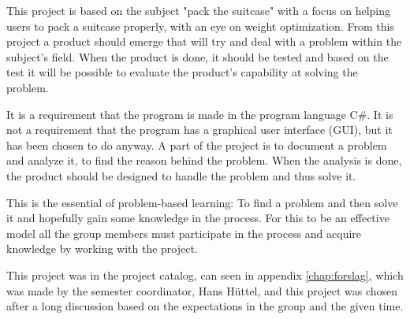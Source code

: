 This project is based on the subject "pack the suitcase" with a focus on helping users to pack a suitcase properly, with an eye on weight optimization. From this project a product should emerge that will try and deal with a problem within the subject's field. When the product is done, it should be tested and based on the test it will be possible to evaluate the product's capability at solving the problem.

It is a requirement that the program is made in the program language C\#. It is not a requirement that the program has a graphical user interface (GUI), but it has been chosen to do anyway.
A part of the project is to document a problem and analyze it, to find the reason behind the problem. When the analysis is done, the product should be designed to handle the problem and thus solve it.

This is the essential of problem-based learning: To find a problem and then solve it and hopefully gain some knowledge in the process.
For this to be an effective model all the group members must participate in the process and acquire knowledge by working with the project.

This project was in the project catalog, can seen in appendix \ref{chap:forslag}, which was made by the semester coordinator, Hans Hüttel, and this project was chosen after a long discussion based on the expectations in the group and the given time.